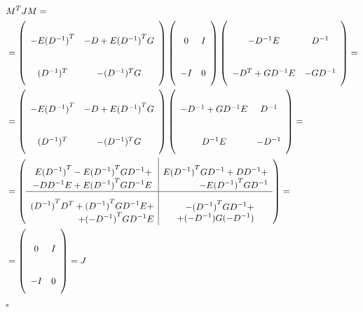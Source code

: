 \begin{equation*}
\begin{split}
& M^{T} J M =
\\
& = \left( \begin{array}{cc}
-E{(D^{-1})}^T & -D+E{(D^{-1})}^T G \\ 
(D^{-1})^T & -(D^{-1})^T G
\end{array} \right)
\left( \begin{array}{cc}
0 & I \\ 
-I & 0
\end{array} \right)
 \left( \begin{array}{cc}
-D^{-1}E & D^{-1} \\ 
-D^T + GD^{-1} E & -GD^{-1}
\end{array} \right) =
\\
& = \left( \begin{array}{cc}
-E{(D^{-1})}^T & -D+E{(D^{-1})}^T G \\ 
(D^{-1})^T & -(D^{-1})^T G
\end{array} \right)
 \left( \begin{array}{cc}
-D^{-1} + GD^{-1}E & D^{-1} \\ 
D^{-1} E & -D^{-1}
\end{array} \right) =
\\
& = 
 \renewcommand*{\arraystretch}{3}
\left( \begin{array}{c | c}
\begin{aligned}
E{(D^{-1})}^T - E{(D^{-1})}^T GD^{-1} + \\ - D D^{-1} E + E{(D^{-1})}^T GD^{-1} E
\end{aligned}
&
\begin{aligned}
E{(D^{-1})}^T GD^{-1} + DD^{-1} + \\ - E{(D^{-1})}^T GD^{-1}
\end{aligned}
\\
\hline
\begin{aligned}
{(D^{-1})}^T D^T + {(D^{-1})}^T GD^{-1} E + \\ + {(-D^{-1})}^T G D^{-1} E
\end{aligned}
&
\begin{aligned}
-{(D^{-1})}^T G D^{-1} + \\ + (-D^{-1}) G (-D^{-1})
\end{aligned}
\end{array} \right) =
\\
&=
\left( \begin{array}{cc}
0 & I \\ 
-I & 0
\end{array} \right) = J
\end{split}
\end{equation*}

\begin{flushright}
$\square$
\end{flushright}
